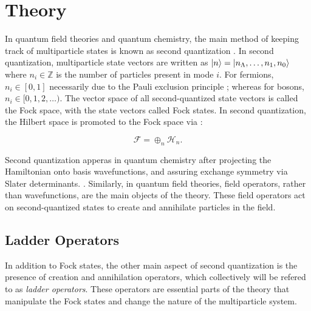 \section{Theory}

In quantum field theories and quantum chemistry, the main method of keeping track of multiparticle states is known as second quantization \cite{Sakurai_Napolitano_2020}.
In second quantization, multiparticle state vectors are written as $\ket{n} = \ket{n_\Lambda, \dots, n_1, n_0}$ where $n_i \in \mathbb{Z}$ is the number of particles present in mode $i$.
For fermions, $n_i \in [0, 1]$ necessarily due to the Pauli exclusion principle ; whereas for bosons, $n_i \in [0, 1, 2, \dots)$.
The vector space of all second-quantized state vectors is called the Fock space, with the state vectors called Fock states. In second quantization, the Hilbert space is promoted to the Fock space via \cite{Schwartz_2013}:

\begin{equation}
    \mathcal{F} = \oplus_n \mathcal{H}_n.
\end{equation}

Second quantization apperas in quantum chemistry after projecting the Hamiltonian onto basis wavefunctions, and assuring exchange symmetry via Slater determinants. .
Similarly, in quantum field theories, field operators, rather than wavefunctions, are the main objects of the theory. These field operators act on second-quantized states to create and annihilate particles in the field. 

\subsection{Ladder Operators}
\label{subsec:operators}
In addition to Fock states, the other main aspect of second quantization is the presence of creation and annihilation operators, which collectively will be refered to as \emph{ladder operators}. These operators are essential parts of the theory that manipulate the Fock states and change the nature of the multiparticle system. 


